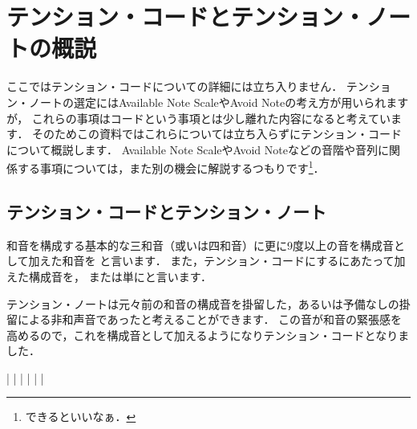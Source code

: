 \documentclass[dvipdfmx,uplatex,b5paper,openany,jbase=12Q,nomag*,textwidth-limit=44%
               ]{gachimuchi}[2020/05/05]
\begin{document}
\begin{comment}
ある和音が鳴っているときに，メロディとして
\end{comment}


\chapter{テンション・コードとテンション・ノートの概説}
\begin{Yodan}
ここではテンション・コードについての詳細には立ち入りません．
テンション・ノートの選定にはAvailable Note ScaleやAvoid Noteの考え方が用いられますが，
これらの事項はコードという事項とは少し離れた内容になると考えています．
そのためこの資料ではこれらについては立ち入らずにテンション・コードについて概説します．
Available Note ScaleやAvoid Noteなどの音階や音列に関係する事項については，また別の機会に解説するつもりです\footnote{
  できるといいなぁ．
}．
\end{Yodan}

\section{テンション・コードとテンション・ノート}
和音を構成する基本的な三和音（或いは四和音）に更に9度以上の音を構成音として加えた和音を
と言います．
また，テンション・コードにするにあたって加えた構成音を，
または単にと言います．

テンション・ノートは元々前の和音の構成音を掛留した，あるいは予備なしの掛留による非和声音であったと考えることができます．
この音が和音の緊張感を高めるので，これを構成音として加えるようになりテンション・コードとなりました．

\begin{Music}[.6\linewidth]
  \generalmeter{\meterC}%
  \Startpiece
  \NOTEs%
  |%
  \en\bar%
  \NOTEs%
  |%
  \en\doublebar%
  \NOTEs%
  |%
  \en%
  \bar%
  \NOTes%
  |%
  \en\setdoublebar%
  \endpiece
\end{Music}
\end{document}
